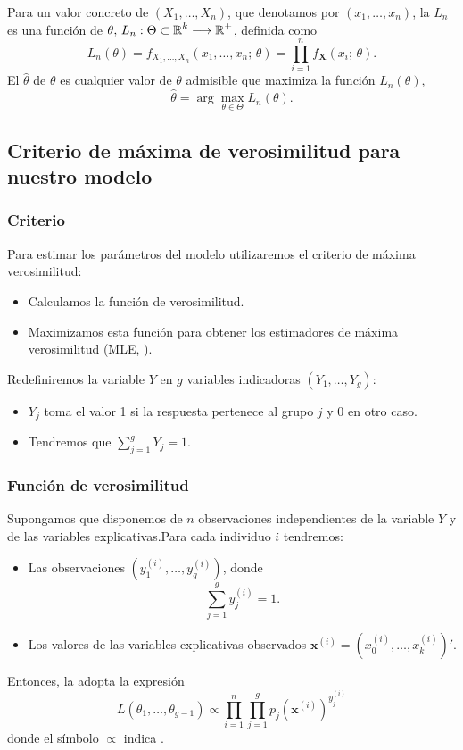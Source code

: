 Para un valor concreto de $(X_1,\dots,X_n)$, que denotamos por $(x_1,\dots,x_n)$, la  $L_n$ es una función de $\theta,\,L_n:\Theta\subset\operatorname{\mathbb{R}}^k\longrightarrow\operatorname{\mathbb{R}}^+$, definida como \[ L_n(\theta)=f_{X_1,\dots,X_n}(x_1,\dots,x_n;\,\theta)=\prod_{i=1}^{n}f_{\mathbf{X}}(x_i;\,\theta). \]
El  $\hat{\theta}$ de $\theta$ es cualquier valor de $\theta$ admisible que maximiza la función $L_n(\theta)$, \[ \hat{\theta}=\arg\max_{\theta\in\Theta}L_n(\theta). \]
\subsection{Criterio de máxima de verosimilitud para nuestro modelo}
\subsubsection{Criterio}
Para estimar los parámetros del modelo utilizaremos el criterio de máxima verosimilitud:
\begin{itemize}
	\item Calculamos la función de verosimilitud.
	\item Maximizamos esta función para obtener los estimadores de máxima verosimilitud (MLE, ).
\end{itemize}
Redefiniremos la variable $Y$ en $g$ variables indicadoras $(Y_1,\dots,Y_g)$:
\begin{itemize}
	\item $Y_j$ toma el valor 1 si la respuesta pertenece al grupo $j$ y 0 en otro caso.
	\item Tendremos que $\sum_{j=1}^{g}Y_j=1$.
\end{itemize}
\subsubsection{Función de verosimilitud}
Supongamos que disponemos de $n$ observaciones independientes de la variable $Y$ y de las variables explicativas.Para cada individuo $i$ tendremos: 
\begin{itemize}
	\item Las observaciones $(y_1^{(i)},\dots,y_g^{(i)})$, donde \[ \sum_{j=1}^{g}y_j^{(i)}=1. \]
	\item Los valores de las variables explicativas observados $\mathbf{x}^{(i)}=(x_0^{(i)},\dots,x_k^{(i)})'$.
\end{itemize}
Entonces, la  adopta la expresión \[ L(\theta_1,\dots,\theta_{g-1})\propto\prod_{i=1}^{n}\prod_{j=1}^{g}p_j(\mathbf{x}^{(i)})^{y_j^{(i)}} \] donde el símbolo $\propto$ indica .
